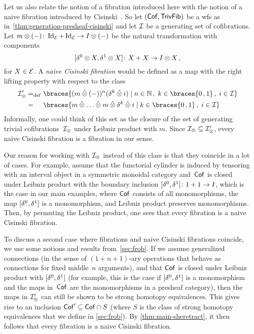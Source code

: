 \documentclass[reqno,10pt,a4paper,oneside,draft]{amsart}
\begin{document}
\begin{remark} \label{cisinski-remark}
Let us also relate the notion of a fibration introduced here with the notion of a naive fibration introduced by Cisinski~\cite{cisinski-asterisque}. So let $(\Cof, \TrivFib)$ be a wfs as in~\cref{thm:generation-presheaf-cisinski}
and let  $\cal{I}$ be a generating set of cofibrations.
Let $m \otimes (-)  \co \Id_\catE + \Id_\catE \to \interval \otimes (-)$ be the natural transformation
with components 
\[
 [\lcyl \otimes X, \rcyl \otimes X] \co X +  X \to \interval \otimes X 
\, , \]
for $X \in \cal{E}$. 
A \emph{naive Cisinski fibration} would be defined as a map with the right lifting property with respect to the class
\begin{align*}
\cal{I}_\otimes'
&\defeq
\braces{(m \hatotimes (-))^n (\kcyl \hatotimes i) \mid n \in \mathbb{N} \, , \; k \in \braces{0\,,1} \, , \;  i \in \cal{I} }
\\
&=_{\phantom{\operatorname{def}}}
\braces{m \hatotimes \ldots \hatotimes m \hatotimes \kcyl \hatotimes i \mid k \in \braces{0\,,1} \, , \;  i \in \cal{I} }
\end{align*}
Informally, one could think of this set as the closure of the set of generating trivial cofibrations~$\cal{I}_\otimes$ under Leibniz product with $m$. Since $\cal{I}_\otimes \subseteq \cal{I}'_\otimes$, every naive Cisinski fibration is a fibration in our sense.

Our reason for working with $\cal{I}_\otimes$ instead of this class is that they coincide in a lot of cases. 
For example, assume that the functorial cylinder is induced by tensoring with an interval object in a symmetric monoidal category and~$\Cof$ is closed under Leibniz product with the boundary inclusion $[\lcyl, \rcyl] \co 1 + 1 \to \interval$, which is the case in 
our main examples, where $\Cof$ consists of all monomorphisms, the map $[\lcyl, \rcyl]$ is a monomorphism, and Leibniz product preserves monomorphisms. Then, by permuting the Leibniz product, one sees that every fibration is a naive Cisinski fibration.

To discuss a second case where fibrations and naive Cisinski fibrations coincide, we use some notions and results from~\cref{sec:frob}.
If we assume generalized connections (in the sense of $(1+n+1)$-ary operations that behave as connections for fixed middle~$n$ arguments), and that $\Cof$ is closed under Leibniz product with $[\lcyl, \rcyl]$ (for example, this is the case if $[\lcyl, \rcyl]$ is a monomorphism and the maps in~$\Cof$ are the monomorphisms in a presheaf category), then the maps in $\cal{I}'_\otimes$ can still be shown to be strong homotopy equivalences.
This gives rise to an inclusion $\Cof' \subseteq \Cof \cap S$ (where $S$ is the class of strong homotopy equivalences that we define in \cref{sec:frob}).
By \cref{thm:main-sheretract}, it then follows that every fibration is a naive Cisinski fibration.
\end{remark}
\end{document}
